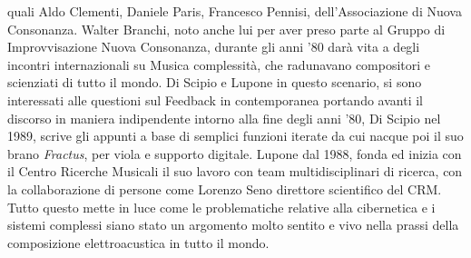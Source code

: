 quali Aldo Clementi, Daniele Paris, Francesco Pennisi,
dell'Associazione di Nuova Consonanza.
Walter Branchi, noto anche lui
per aver preso parte al Gruppo di Improvvisazione Nuova Consonanza,
durante gli anni '80 darà vita a degli incontri internazionali su
Musica complessità, che radunavano compositori e scienziati di
tutto il mondo.
Di Scipio e Lupone in questo scenario, si sono interessati alle questioni
sul Feedback in contemporanea
portando avanti il discorso in maniera indipendente intorno alla fine degli anni '80,
Di Scipio nel 1989, scrive gli appunti a base di semplici funzioni
iterate da cui nacque poi il suo brano 
\textit{Fractus}, per viola e supporto digitale.
Lupone dal 1988, fonda ed inizia con il Centro Ricerche Musicali il suo lavoro
con team multidisciplinari di ricerca,
con la collaborazione di persone come Lorenzo Seno direttore scientifico del CRM.
Tutto questo mette in luce come le problematiche relative alla cibernetica
e i sistemi complessi siano stato un argomento molto sentito e vivo
nella prassi della composizione elettroacustica in tutto il mondo.

